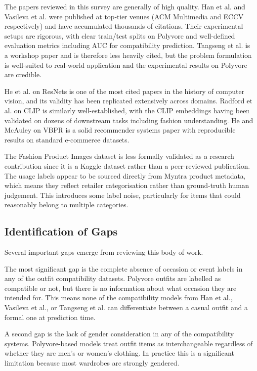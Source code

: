 \documentclass[conference]{IEEEtran}
\begin{document}
The papers reviewed in this survey are generally of high quality. Han et al. \cite{b2} and Vasileva et al. \cite{b3} were published at top-tier venues (ACM Multimedia and ECCV respectively) and have accumulated thousands of citations. Their experimental setups are rigorous, with clear train/test splits on Polyvore and well-defined evaluation metrics including AUC for compatibility prediction. Tangseng et al. \cite{b4} is a workshop paper and is therefore less heavily cited, but the problem formulation is well-suited to real-world application and the experimental results on Polyvore are credible.

He et al. \cite{b1} on ResNets is one of the most cited papers in the history of computer vision, and its validity has been replicated extensively across domains. Radford et al. \cite{b8} on CLIP is similarly well-established, with the CLIP embeddings having been validated on dozens of downstream tasks including fashion understanding. He and McAuley \cite{b5} on VBPR is a solid recommender systems paper with reproducible results on standard e-commerce datasets.

The Fashion Product Images dataset \cite{b6} is less formally validated as a research contribution since it is a Kaggle dataset rather than a peer-reviewed publication. The usage labels appear to be sourced directly from Myntra product metadata, which means they reflect retailer categorisation rather than ground-truth human judgement. This introduces some label noise, particularly for items that could reasonably belong to multiple categories.

\subsection{Identification of Gaps}

Several important gaps emerge from reviewing this body of work.

The most significant gap is the complete absence of occasion or event labels in any of the outfit compatibility datasets. Polyvore outfits are labelled as compatible or not, but there is no information about what occasion they are intended for. This means none of the compatibility models from Han et al., Vasileva et al., or Tangseng et al. can differentiate between a casual outfit and a formal one at prediction time.

A second gap is the lack of gender consideration in any of the compatibility systems. Polyvore-based models treat outfit items as interchangeable regardless of whether they are men's or women's clothing. In practice this is a significant limitation because most wardrobes are strongly gendered.
\end{document}
